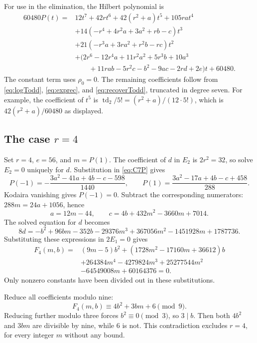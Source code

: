\documentclass[11pt,reqno,letterpaper]{amsart}
\newcommand{\td}{\operatorname{td}}
\theoremstyle{definition}
\numberwithin{equation}{section}
\begin{document}
For use in the elimination, the Hilbert polynomial is
\begin{align}
60480P(t)={}&12t^7+42rt^6+42(r^2+a)t^5+105rat^4\nonumber\\
 &+14(-r^4+4r^2a+3a^2+rb-c)t^3\nonumber\\
 &+21(-r^3a+3ra^2+r^2b-rc)t^2\nonumber\\
 &+\bigl(2r^6-12r^4a+11r^2a^2+5r^3b+10a^3\nonumber\\
 &\qquad+11rab-5r^2c-b^2-9ac-2rd+2e\bigr)t+60480.
 \label{eq:C7P}
\end{align}
The constant term uses $\rho_0=0$. The remaining coefficients follow
from \eqref{eq:logTodd}, \eqref{eq:exprec}, and
\eqref{eq:recoverTodd}, truncated in degree seven. For example, the coefficient
of $t^5$ is $\td_2/5!=(r^2+a)/(12\cdot5!)$,
which is $42(r^2+a)/60480$ as displayed.

\subsection{The case \texorpdfstring{$r=4$}{r=4}}
Set $r=4$, $e=56$, and $m=P(1)$. The coefficient of $d$ in $E_2$
is $2r^2=32$, so solve $E_2=0$ uniquely for $d$.
Substitution in \eqref{eq:C7P} gives
\[
 P(-1)=-\frac{3a^2-41a+4b-c-598}{1440},\qquad
 P(1)=\frac{3a^2-17a+4b-c+458}{288}.
\]
Kodaira vanishing gives $P(-1)=0$. Subtract the corresponding numerators:
$288m=24a+1056$, hence
\[
 a=12m-44,\qquad
 c=4b+432m^2-3660m+7014.
\]
The solved equation for $d$ becomes
\[
 8d=-b^2+96bm-352b-29376m^3
       +367056m^2-1451928m+1787736.
\]
Substituting these expressions in $2E_1=0$ gives
\begin{align}
 F_4(m,b)={}&(9m-5)b^2+(1728m^2-17160m+36612)b\nonumber\\
 &+264384m^4-4279824m^3+25277544m^2\nonumber\\
 &-64549008m+60164376=0.\label{eq:C7F4}
\end{align}
Only nonzero constants have been divided out in these substitutions.

Reduce all coefficients modulo nine:
\[
 F_4(m,b)\equiv4b^2+3bm+6\pmod9.
\]
Reducing further modulo three forces $b^2\equiv0\pmod3$, so $3\mid b$.
Then both $4b^2$ and $3bm$ are divisible by nine, while $6$ is not.
This contradiction excludes $r=4$, for every integer $m$ without any bound.
\end{document}

